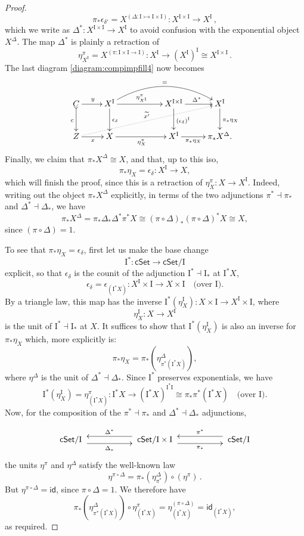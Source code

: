 \documentclass[11pt]{article}
\newcommand{\cSet}{\ensuremath{\mathsf{cSet}}}
\newcommand{\mono}{\ensuremath{\rightarrowtail}}
\newcommand{\ra}{\ensuremath{\rightarrow}}
\newcommand{\I}{\ensuremath{\mathrm{I}}}
\theoremstyle{remark}
\theoremstyle{definition}
\begin{document}
\begin{proof}
\[
\pi_*{\epsilon_{\delta'}} = X^{(\Delta: \I \mono \I\times\I)} : X^{\I\times\I} \to X^\I\,,
\]
which we write as $\Delta^* : X^{\I\times\I} \to X^\I$ to avoid confusion with the exponential object $X^\Delta$.
The map $\Delta^* $ is plainly a retraction of 
\[
\eta^{\pi}_{X^\I} = X^{(\pi: \I\times\I\ra \I)}: X^\I \to (X^\I)^\I \cong X^{\I\times\I}\,.
\]
The last diagram \eqref{diagram:compimpfill4} now becomes
\begin{equation}\label{diagram:compimpfill5}
\xymatrix{
C \ar@{>->}[d]_{c} \ar[r]^y  & X^\I \ar[d]^{\epsilon_\delta} \ar[rr]^{\eta^{\pi}_{X^\I}}  \ar@/^5ex/ [rrr] ^{=}
	&&  X^{\I\times\I}  \ar[d]^{(\epsilon_\delta)^\I} \ar[r]^{\Delta^*}  &  X^\I   \ar[d]^{\pi_*\eta_X} \\
Z \ar[r]_x \ar@{..>}[rrrru]^{\widetilde{x'}} & X \ar[rr]_{\eta^\pi_X} 
	&& X^\I \ar[r]_-{\pi_*\eta_X} & \pi_*X^\Delta.
}
\end{equation}
Finally, we claim that $\pi_*X^\Delta \cong X$, and that, up to this iso,  $$\pi_*\eta_X = \epsilon_\delta : X^\I\ra X,$$ which will finish the proof, since this is a retraction of $\eta^\pi_X : X\ra X^\I$.  Indeed, writing out the object $\pi_*X^\Delta$ explicitly, in terms of the two adjunctions $\pi^* \dashv {\pi}_*$ and $\Delta^* \dashv \Delta_*$, we have
\[
\pi_*X^\Delta = \pi_*\Delta_*\Delta^*\pi^*X \cong (\pi\circ\Delta)_*(\pi\circ\Delta)^*X \cong X,
\]
since $(\pi\circ\Delta) = 1$.  

To see that $\pi_*\eta_X = \epsilon_\delta$, first let us make the base change $$\I^* : \cSet \to \cSet/\I$$ explicit, so that $\epsilon_\delta$ is the counit of the adjunction $\I^* \dashv \I_*$ at $\I^*X$,
\[
\epsilon_\delta = \epsilon_{(\I^*X)} : X^\I \times \I \to X\times \I \quad\text{(over $\I$)}.
\]  
By a triangle law, this map has the inverse $\I^*(\eta_{X}^\I) : X\times\I \to X^\I \times \I$, where $$\eta_X^\I : X \ra X^\I$$ is the unit of $\I^*\dashv \I_*$ at $X$.  It suffices to show that $\I^*(\eta_{X}^\I)$ is also an inverse for $\pi_*\eta_X$ which, more explicitly is:
\[
\pi_*\eta_X = \pi_*(\eta^\Delta_{\pi^*(\I^*X)}),
\]
where $\eta^\Delta$ is the unit of $\Delta^* \dashv \Delta_*$. Since $\I^*$ preserves exponentials, we have
\[
\I^*(\eta_{X}^\I) = \eta_{(\I^*X)}^\pi : \I^*X \to (\I^*X)^{\I^*\I} \cong \pi_*\pi^*(\I^*X)\quad\text{(over $\I$)}.
\]
Now, for the composition of the $\pi^* \dashv {\pi}_*$ and $\Delta^* \dashv \Delta_*$ adjunctions, 

\begin{equation}\label{diagram:Deltapibasechange}
\xymatrix{
\cSet/\I\ \ar@<-1ex>[rr]_-{\Delta_*}  && \ar@<-1ex>[ll]_-{\Delta^*} \ \cSet/\I\times\I \ \ar@<-1ex>[rr]_-{\pi_*}  
	&& \ar@<-1ex>[ll]_-{\pi^*} \ \cSet/\I 
}
\end{equation}
the units $\eta^\pi$ and $\eta^\Delta$ satisfy the well-known law
\[
\eta^{\pi\circ\Delta} = \pi_*(\eta^{\Delta}_{\pi^*}) \circ (\eta^\pi)\,.
\]
But $\eta^{\pi\circ\Delta} = \mathsf{id}$, since $\pi\circ\Delta =1$.  We therefore have 
\[
\pi_*(\eta^\Delta_{\pi^*(\I^*X)}) \circ \eta_{(\I^*X)}^\pi = \eta^{(\pi\circ\Delta)}_{(\I^*X)} = \mathsf{id}_{(\I^*X)},
\]
as required.
\end{proof}
\end{document}
